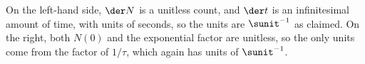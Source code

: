 On the left-hand side, $\der N$ is a unitless count, and $\der t$ is an infinitesimal amount of
time, with units of seconds, so the units are $\sunit^{-1}$ as claimed. On the right, both
$N(0)$ and the exponential factor are unitless, so the only units come from the factor of $1/\tau$,
which again has units of $\sunit^{-1}$.

